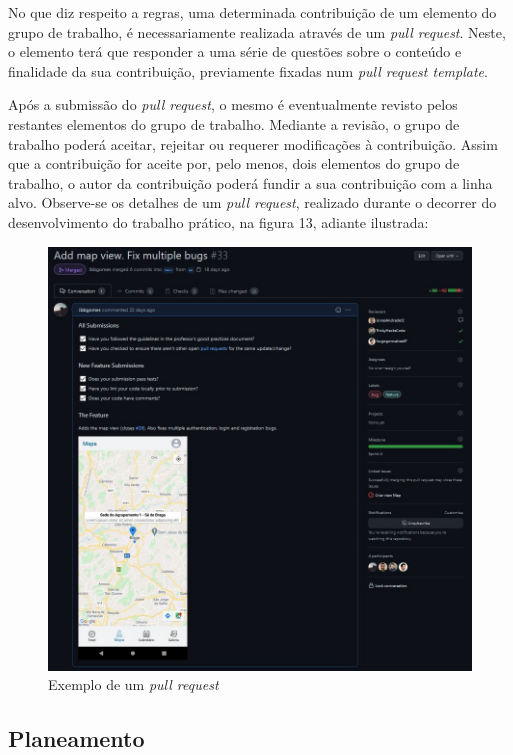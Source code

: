\documentclass[12pt]{report}
\begin{document}
No que diz respeito a regras, uma determinada contribuição de um elemento do grupo de trabalho, é necessariamente realizada através de um \textit{pull request}. Neste, o elemento terá que responder a uma série de questões sobre o conteúdo e finalidade da sua contribuição, previamente fixadas num \textit{pull request template}. 

Após a submissão do \textit{pull request}, o mesmo é eventualmente revisto pelos restantes elementos do grupo de trabalho. Mediante a revisão, o grupo de trabalho poderá aceitar, rejeitar ou requerer modificações à contribuição. Assim que a contribuição for aceite por, pelo menos, dois elementos do grupo de trabalho, o autor da contribuição poderá fundir a sua contribuição com a linha alvo. Observe-se os detalhes de um \textit{pull request}, realizado durante o decorrer do desenvolvimento do trabalho prático, na figura 13, adiante ilustrada:

\bigskip
\begin{figure}[H]
    \centering
    \includegraphics[width=1\textwidth]{pull-request.png}
    \caption{Exemplo de um \textit{pull request}}
\end{figure}

\subsection{Planeamento}
\end{document}
